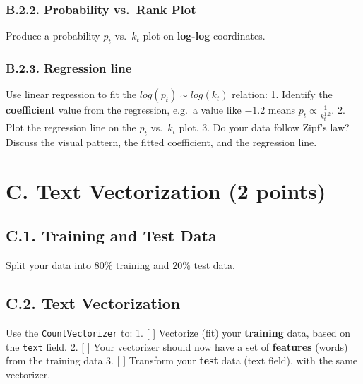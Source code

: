 \documentclass[
  letterpaper,
]{scrbook}
\begin{document}
\subsubsection*{B.2.2. Probability vs.~Rank
Plot}\label{b.2.2.-probability-vs.-rank-plot}

Produce a probability \(p_t\) vs.~\(k_t\) plot on \textbf{log-log}
coordinates.

\subsubsection*{B.2.3. Regression line}\label{b.2.3.-regression-line}

Use linear regression to fit the \(log(p_t) \sim log(k_t)\) relation: 1.
Identify the \textbf{coefficient} value from the regression, e.g.~a
value like \(-1.2\) means \(p_t \propto \frac{1}{k_t^{1.2}}\). 2. Plot
the regression line on the \(p_t\) vs.~\(k_t\) plot. 3. Do your data
follow Zipf's law? Discuss the visual pattern, the fitted coefficient,
and the regression line.

\section*{C. Text Vectorization (2
points)}\label{c.-text-vectorization-2-points}


\subsection*{C.1. Training and Test
Data}\label{c.1.-training-and-test-data}

Split your data into \(80\%\) training and \(20\%\) test data.

\subsection*{C.2. Text Vectorization}\label{c.2.-text-vectorization}

Use the \texttt{CountVectorizer} to: 1. {[} {]} Vectorize (fit) your
\textbf{training} data, based on the \texttt{text} field. 2. {[} {]}
Your vectorizer should now have a set of \textbf{features} (words) from
the training data 3. {[} {]} Transform your \textbf{test} data (text
field), with the same vectorizer.
\end{document}

